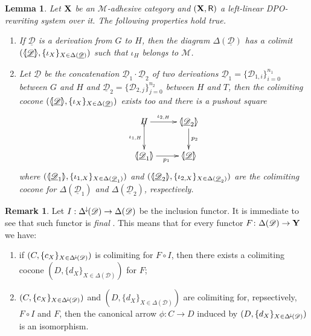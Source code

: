 \documentclass[a4paper]{article}
\newcommand{\Deltamin}{\Delta^{\hspace{-1pt}\downarrow\hspace{-1pt}}}
\def\R{\mathsf{R}}
\def\X{\textbf {\textup{X}}}
\def\Y{\textbf {\textup{Y}}}
\newcommand{\dder}[1]{\mathscr{#1}}
\newcommand{\der}[1]{\underline{\dder{#1}}}
\newcommand{\lpro}{\langle \hspace{-1.85pt}[}
\newcommand{\rpro}{]\hspace{-1.85pt}\rangle}
\newcommand{\tpro}[1]{\lpro \der{#1}\rpro}
\newcommand{\tproi}[2]{\lpro \der{#1}_{#2}\rpro}
\newtheorem{lemma}[theorem]{Lemma}
\theoremstyle{definition}
\newtheorem{remark}[theorem]{Remark}
\begin{document}
\begin{lemma}\label{lem:colim}
	Let $\X$ be an $\mathcal{M}$-adhesive category and $(\X, \R)$ a left-linear DPO-rewriting system over it. The following properties hold true.
	\begin{enumerate}
		\item  If $\der{D}$ is a derivation from $G$ to $H$, then the diagram $\Delta(\der{D})$ has a colimit $(\tpro{D}, \{\iota_X\}_{X\in \Delta(\der{D})})$ such that $\iota_H$ belongs to $\mathcal{M}$.
		\item Let $\der{D}$ be the concatenation $\der{D}_1\cdot \der{D}_2$ of two derivations $\der{D}_1=\{\dder{D}_{1,i}\}_{i=0}^{n_1}$ between $G$ and $H$ and $\der{D}_2=\{\dder{D}_{2,j}\}_{j=0}^{n_2}$ between $H$ and $T$,  then the colimiting cocone $(\tpro{D}, \{\iota_X\}_{X\in \Delta(\der{D})})$ exists too and there is a pushout square
		\[\xymatrix{H\ar[r]^-{\iota_{2, H}} \ar@{>->}[d]_-{\iota_{1, H}} & \tproi{D}{2} \ar[d]^{p_2}\\  \tproi{D}{1} \ar[r]_{p_1}& \tpro{D}}\]
		where $(\tproi{D}{1}, \{\iota_{1, X}\}_{X\in \Delta(\der{D}_1)})$ and $(\tproi{D}{2}, \{\iota_{2, X}\}_{X\in \Delta(\der{D}_2)})$ are the colimiting cocone for $\Delta(\der{D}_1)$ and $\Delta(\der{D}_2)$, respectively.
	\end{enumerate}
\end{lemma}
\begin{remark}\label{rem:cof}
Let $I:\Deltamin(\dder{D})\to \Delta(\dder{D})$ be the inclusion functor. It is immediate to see that such functor is \emph{final} \cite{mac2013categories}. This means that for every functor $F\colon \Delta(\dder{D})\to \Y$ we have:
\begin{enumerate}
	\item if  $(C, \{c_X\}_{X\in \Deltamin(\dder{D})})$ is colimiting for $F\circ I$, then there exists a colimiting cocone $(D, \{d_X\}_{X\in \Delta(\dder{D})})$ for $F$;
	\item $(C, \{c_X\}_{X\in \Deltamin(\dder{D})})$ and $(D, \{d_X\}_{X\in \Delta(\dder{D})})$ are colimiting for, repsectively, $F\circ I$ and $F$, then the canonical arrow $\phi\colon C\to D$ induced by $(D, \{d_X\}_{X\in \Deltamin(\dder{D})})$ is an isomorphism.
\end{enumerate}
\end{remark}
\end{document}
